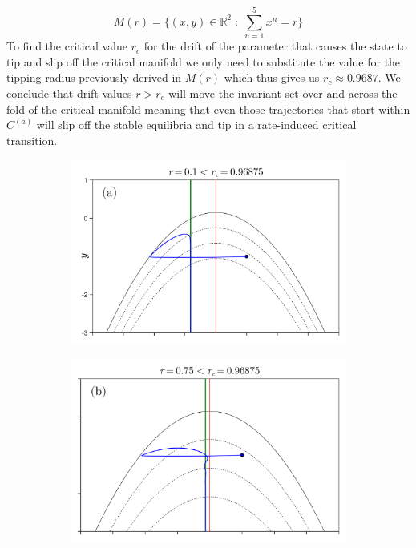 \documentclass[../main.tex]{subfiles}
\begin{document}
\begin{example}[label=ex3.2]{}{}
\begin{equation*}
        M(r) = \{(x, y)\in \mathbb{R}^{2}\;:\;\sum_{n=1}^{5}x^{n}=r\}
\end{equation*}
To find the critical value $r_{c}$ for the drift of the parameter that causes the state to tip and slip off the critical manifold we only need to substitute the value for the tipping radius previously derived in $M(r)$ which thus gives us $r_{c}\approx 0.9687$.
We conclude that drift values $r>r_{c}$ will move the invariant set over and across the fold of the critical manifold meaning that even those trajectories that start within $C^{(a)}$ will slip off the stable equilibria and tip in a rate-induced critical transition.
\end{example}
\begin{example_continued}
\begin{figure}[H]
    \centering 
    \begin{subfigure}[b]{0.485\textwidth}
        \centering 
        \includegraphics[keepaspectratio, width = \linewidth]{../figures/fig3.2.1.png}
        \label{fig3.2.1}
    \end{subfigure}
    \hfill 
    \begin{subfigure}[b]{0.485\textwidth}
        \centering 
        \includegraphics[keepaspectratio, width = \linewidth]{../figures/fig3.2.2.png}
        \label{fig3.2.2}
    \end{subfigure}



\end{figure}
\end{example_continued}
\end{document}
